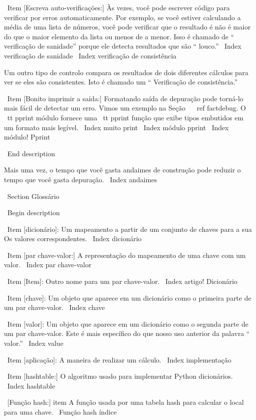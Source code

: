 \documentclass[10pt]{book}
\begin{document}
{{{{{{{\ Item [Escreva auto-verificações:] Às vezes, você pode escrever código para verificar
por erros automaticamente. Por exemplo, se você estiver calculando a
média de uma lista de números, você pode verificar que o resultado é
não é maior do que o maior elemento da lista ou menos de
a menor. Isso é chamado de `` verificação de sanidade'' porque ele detecta
resultados que são `` louco.''
\ Index {verificação de sanidade}
\ Index {verificação de consistência}

Um outro tipo de controlo compara os resultados de dois diferentes
cálculos para ver se eles são consistentes. Isto é chamado um
`` Verificação de consistência.''

\ Item [Bonito imprimir a saída:] Formatando saída de depuração
pode torná-lo mais fácil de detectar um erro. Vimos um exemplo na
Seção ~ \ ref {} factdebug. O {\ tt pprint} módulo fornece
uma {\ tt pprint} função que exibe tipos embutidos em
um formato mais legível.
\ Index {muito print}
\ Index {módulo pprint}
\ Index {módulo! Pprint}

\ End {description}

Mais uma vez, o tempo que você gasta andaimes de construção pode reduzir
o tempo que você gasta depuração.
\ Index {} andaimes

\ Section {} Glossário

\ Begin {description}

\ Item [dicionário]: Um mapeamento a partir de um conjunto de chaves para a sua
Os valores correspondentes.
\ Index {} dicionário

\ Item [par chave-valor:] A representação do mapeamento de
uma chave com um valor.
\ Index {par chave-valor}

\ Item [Item]: Outro nome para um par chave-valor.
\ Index {artigo! Dicionário}

\ Item [chave]: Um objeto que aparece em um dicionário como o
primeira parte de um par chave-valor.
\ Index {chave}

\ Item [valor]: Um objeto que aparece em um dicionário como o
segunda parte de um par chave-valor. Este é mais específico do que
nosso uso anterior da palavra `` valor.''
\ Index {value}

\ Item [aplicação]: A maneira de realizar um cálculo.
\ Index {implementação}

\ Item [hashtable:] O algoritmo usado para implementar Python
dicionários.
\ Index {} hashtable

\ [Função hash:] item A função usada por uma tabela hash para calcular o
local para uma chave.
\ {Função hash} índice

}}}}}}}
\end{document}
